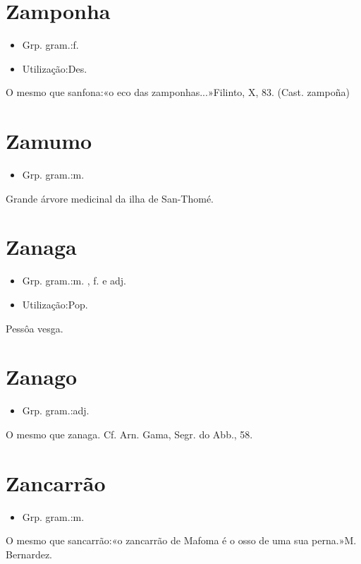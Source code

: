 \section{Zamponha}
\begin{itemize}
\item {Grp. gram.:f.}
\end{itemize}
\begin{itemize}
\item {Utilização:Des.}
\end{itemize}
O mesmo que \textunderscore sanfona\textunderscore :«\textunderscore o eco das zamponhas...\textunderscore »Filinto, X, 83.
(Cast. \textunderscore zampoña\textunderscore )
\section{Zamumo}
\begin{itemize}
\item {Grp. gram.:m.}
\end{itemize}
Grande árvore medicinal da ilha de San-Thomé.
\section{Zanaga}
\begin{itemize}
\item {Grp. gram.:m. ,  f.  e  adj.}
\end{itemize}
\begin{itemize}
\item {Utilização:Pop.}
\end{itemize}
Pessôa vesga.
\section{Zanago}
\begin{itemize}
\item {Grp. gram.:adj.}
\end{itemize}
O mesmo que \textunderscore zanaga\textunderscore . Cf. Arn. Gama, \textunderscore Segr. do Abb.\textunderscore , 58.
\section{Zancarrão}
\begin{itemize}
\item {Grp. gram.:m.}
\end{itemize}
O mesmo que \textunderscore sancarrão\textunderscore :«\textunderscore o zancarrão de Mafoma é o osso de uma sua perna.\textunderscore »M. Bernardez.
